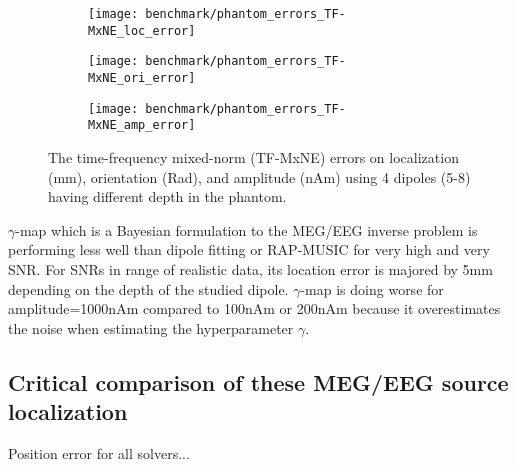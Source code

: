 \begin{sidewaysfigure}[ht]
        \centering
        \begin{subfigure}[b]{0.28\textwidth}
            \centering
            \texttt{[image: benchmark/phantom\_errors\_TF-MxNE\_loc\_error]}
            \label{fig:tfmxne_pos}
        \end{subfigure}
		\hspace{35pt}
        \begin{subfigure}[b]{0.28\textwidth}  
            \centering 
            \texttt{[image: benchmark/phantom\_errors\_TF-MxNE\_ori\_error]}
            \label{fig:tfmxne_ori}
        \end{subfigure}
		\hspace{35pt}
        \begin{subfigure}[b]{0.28\textwidth}   
            \centering 
            \texttt{[image: benchmark/phantom\_errors\_TF-MxNE\_amp\_error]}
            \label{fig:tfmxne_amp}
        \end{subfigure}

		\caption{The time-frequency mixed-norm (TF-MxNE) errors on localization (mm), orientation (Rad), and amplitude (nAm) using 4 dipoles (5-8) having different depth in the phantom.\label{fig:tfmxne_errors}}
\end{sidewaysfigure}

$\gamma$-map which is a Bayesian formulation to the MEG/EEG inverse problem is performing less well than dipole fitting or RAP-MUSIC for very high and very SNR. For SNRs in range of realistic data, its location error is majored by 5mm depending on the depth of the studied dipole. $\gamma$-map is doing worse for amplitude=1000nAm compared to 100nAm or 200nAm because it overestimates the noise when estimating the hyperparameter $\gamma$.



\subsection{Critical comparison of these MEG/EEG source localization}
Position error for all solvers...

